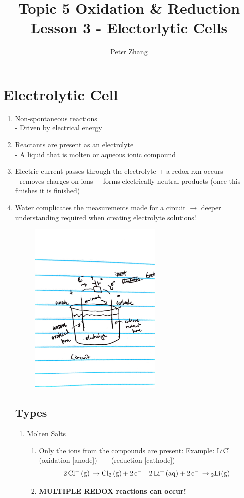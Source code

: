 \documentclass{article}
\title{Topic 5 Oxidation \& Reduction\\Lesson 3 - Electorlytic Cells}
\author{Peter Zhang}
\begin{document}
\maketitle
\tableofcontents
\newpage

\section{Electrolytic Cell}
\begin{enumerate}
\item Non-spontaneous reactions\\- Driven by electrical energy
\item Reactants are present as an electrolyte\\- A liquid that is molten or aqueous ionic compound
\item Electric current passes through the electrolyte + a redox rxn occurs\\- removes charges on ions + forms electrically neutral products (once this finishes it is finished)
\item Water complicates the measurements made for a circuit $\rightarrow$ deeper understanding required when creating electrolyte solutions!
\begin{figure}[H]
\includegraphics[width=0.6\textwidth]{5.3circuit1.JPG}
\end{figure}


\subsection{Types}
\begin{enumerate}
\item Molten Salts
\begin{enumerate}
\item Only the ions from the compounds are present:
Example: LiCl (oxidation [anode])\ \ \ \ (reduction [cathode])
$$\ce{2Cl- (g) \rightarrow Cl2 (g) + 2e-}\ \ \ \ce{2Li+ (aq) + 2e- \rightarrow 2Li(g)}$$
\item \textbf{MULTIPLE REDOX reactions can occur!}
\end{enumerate}
\end{enumerate}


\end{enumerate}
\end{document}
